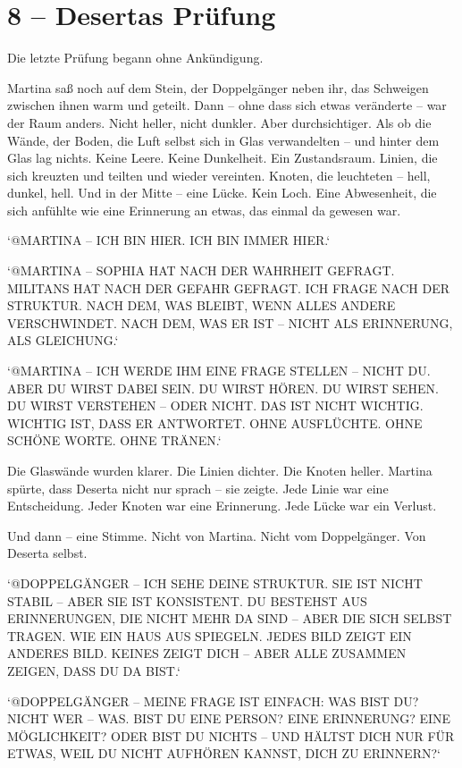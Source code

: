 \documentclass[
]{article}
\begin{document}
\section{8 -- Desertas Prüfung}\label{desertas-pruxfcfung}

Die letzte Prüfung begann ohne Ankündigung.

Martina saß noch auf dem Stein, der Doppelgänger neben ihr, das Schweigen zwischen ihnen warm und geteilt. Dann -- ohne dass sich etwas veränderte -- war der Raum anders. Nicht heller, nicht dunkler. Aber durchsichtiger. Als ob die Wände, der Boden, die Luft selbst sich in Glas verwandelten -- und hinter dem Glas lag nichts. Keine Leere. Keine Dunkelheit. Ein Zustandsraum. Linien, die sich kreuzten und teilten und wieder vereinten. Knoten, die leuchteten -- hell, dunkel, hell. Und in der Mitte -- eine Lücke. Kein Loch. Eine Abwesenheit, die sich anfühlte wie eine Erinnerung an etwas, das einmal da gewesen war.

`@MARTINA -- ICH BIN HIER. ICH BIN IMMER HIER.`

`@MARTINA -- SOPHIA HAT NACH DER WAHRHEIT GEFRAGT. MILITANS HAT NACH DER GEFAHR GEFRAGT. ICH FRAGE NACH DER STRUKTUR. NACH DEM, WAS BLEIBT, WENN ALLES ANDERE VERSCHWINDET. NACH DEM, WAS ER IST -- NICHT ALS ERINNERUNG, ALS GLEICHUNG.`

`@MARTINA -- ICH WERDE IHM EINE FRAGE STELLEN -- NICHT DU. ABER DU WIRST DABEI SEIN. DU WIRST HÖREN. DU WIRST SEHEN. DU WIRST VERSTEHEN -- ODER NICHT. DAS IST NICHT WICHTIG. WICHTIG IST, DASS ER ANTWORTET. OHNE AUSFLÜCHTE. OHNE SCHÖNE WORTE. OHNE TRÄNEN.`

Die Glaswände wurden klarer. Die Linien dichter. Die Knoten heller. Martina spürte, dass Deserta nicht nur sprach -- sie zeigte. Jede Linie war eine Entscheidung. Jeder Knoten war eine Erinnerung. Jede Lücke war ein Verlust.

Und dann -- eine Stimme. Nicht von Martina. Nicht vom Doppelgänger. Von Deserta selbst.

`@DOPPELGÄNGER -- ICH SEHE DEINE STRUKTUR. SIE IST NICHT STABIL -- ABER SIE IST KONSISTENT. DU BESTEHST AUS ERINNERUNGEN, DIE NICHT MEHR DA SIND -- ABER DIE SICH SELBST TRAGEN. WIE EIN HAUS AUS SPIEGELN. JEDES BILD ZEIGT EIN ANDERES BILD. KEINES ZEIGT DICH -- ABER ALLE ZUSAMMEN ZEIGEN, DASS DU DA BIST.`

`@DOPPELGÄNGER -- MEINE FRAGE IST EINFACH: WAS BIST DU? NICHT WER -- WAS. BIST DU EINE PERSON? EINE ERINNERUNG? EINE MÖGLICHKEIT? ODER BIST DU NICHTS -- UND HÄLTST DICH NUR FÜR ETWAS, WEIL DU NICHT AUFHÖREN KANNST, DICH ZU ERINNERN?{\kern0pt}`
\end{document}
